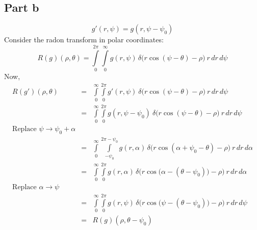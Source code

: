 \documentclass[12pt]{article}
\begin{document}
\subsection*{Part b}
$$g'(r, \psi) = g(r, \psi - \psi_0)$$
Consider the radon transform in polar coordinates:
$$R(g)(\rho, \theta) = \int \limits_{0}^{2\pi} \int \limits_{0}^\infty g(r, \psi)\, \delta\bigg(r\cos(\psi-\theta) - \rho\bigg)\: r\,dr\,d\psi$$
Now, 
\begin{eqnarray*}
	R(g')(\rho, \theta) &=& \int \limits_{0}^\infty \int \limits_{0}^{2\pi} g'(r, \psi) \: \delta\bigg(r \cos(\psi - \theta) - \rho\bigg) \: r\, dr\, d\psi\\
	&=& \int \limits_{0}^\infty \int \limits_{0}^{2\pi} g(r, \psi - \psi_0) \: \delta\bigg(r \cos(\psi  - \theta) - \rho\bigg) \: r\, dr\, d\psi\\
	\text{Replace }\psi \rightarrow \psi_0 + \alpha &&\\
	&=& \int \limits_0^\infty \int \limits_{-\psi_0}^{2\pi-\psi_0}g(r, \alpha)\, \delta\bigg(r \cos(\alpha + \psi_0 - \theta) - \rho\bigg) \: r\,dr\,d\alpha\\
	&=& \int \limits_0^\infty \int \limits_{0}^{2\pi} g(r, \alpha)\, \delta\bigg(r \cos \big(\alpha - (\theta - \psi_0)\big) - \rho\bigg)\: r \,dr\,d\alpha\\
	\text{Replace } \alpha \rightarrow \psi&&\\
&=&	\int \limits_0^\infty \int \limits_{0}^{2\pi} g(r, \psi)\, \delta\bigg(r \cos \big(\psi - (\theta - \psi_0)\big) - \rho\bigg)\: r \,dr\,d\psi\\
&=& R(g)(\rho, \theta - \psi_0)
\end{eqnarray*}
\end{document}
